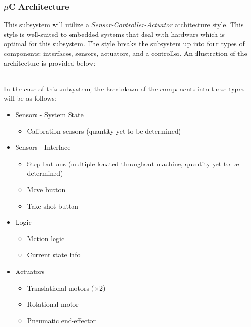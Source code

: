 \documentclass[titlepage]{article}
\begin{document}
\subsubsection{$\mu$C Architecture}
This subsystem will utilize a \textit{Sensor-Controller-Actuator} architecture style. This style is well-suited to embedded systems that deal with hardware which is optimal for this subsystem. The style breaks the subsystem up into four types of components: interfaces, sensors, actuators, and a controller. An illustration of the architecture is provided below:\\
\begin{center}
\label{fig:Sensor-Controller-Actuator Architecture}
\end{center}~\\
In the case of this subsystem, the breakdown of the components into these types will be as follows:
\begin{itemize}
	\item Sensors - System State
	\begin{itemize}
		\item Calibration sensors (quantity yet to be determined)
	\end{itemize}
	\item Sensors - Interface
	\begin{itemize}
		\item Stop buttons (multiple located throughout machine, quantity yet to be determined)
		\item Move button
		\item Take shot button
	\end{itemize}
	\item Logic
	\begin{itemize}
		\item Motion logic
		\item Current state info
	\end{itemize}
	\item Actuators
	\begin{itemize}
		\item Translational motors ($\times2$)
		\item Rotational motor
		\item Pneumatic end-effector
	\end{itemize}
\end{itemize}
\end{document}

